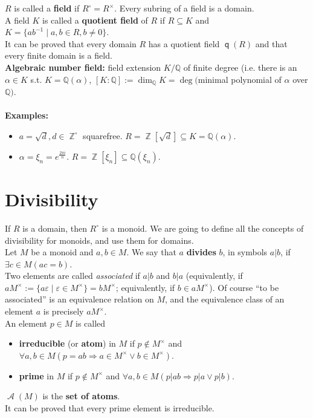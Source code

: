 \documentclass[12pt,a4paper]{report}
\theoremstyle{definition}
\theoremstyle{num.custom-title}
\DeclareMathOperator{\A}{\mathcal{A}}
\DeclareMathOperator{\Z}{\mathbb{Z}}
\DeclareMathOperator{\imp}{\Rightarrow}
\DeclareMathOperator{\sse}{\subseteq}
\DeclareMathOperator{\q}{\mathsf{q}}
\newcommand{\Q}{\mathbb{Q}}
\renewcommand{\epsilon}{\varepsilon}
\begin{document}
$R$ is called a \textbf{field} if $R^\circ=R^\times$. Every subring of a field is a domain.\\
A field $K$ is called a \textbf{quotient field} of $R$ if $R \sse K$ and $K=\{a b^{-1} \mid a,b \in R, b \neq 0\}$.\\
It can be proved that every domain $R$ has a quotient field $\q(R)$ and that every finite domain is a field.\\
\textbf{Algebraic number field:} field extension $K/\Q$ of finite degree (i.e. there is an $\alpha \in K$ s.t. $K=\Q(\alpha)$, $[K:\Q]:=\dim_{\Q} K = \deg($minimal polynomial of $\alpha$ over $\Q)$.\\
\\
\textbf{Examples:}
\begin{itemize}
\item $a=\sqrt{d}, d \in \Z^\circ$ squarefree. $R=\Z[\sqrt{d}] \sse K=\Q(\alpha)$.
\item $\alpha= \xi_n = e^{\frac{2\pi i}{n}}$. $R=\Z[\xi_n] \sse \Q(\xi_n)$.
\end{itemize}


\section{Divisibility}

If $R$ is a domain, then $R^\circ$ is a monoid. We are going to define all the concepts of divisibility for monoids, and use them for domains.\\
Let $M$ be a monoid and $a,b \in M$. We say that $a$ \textbf{divides} $b$, in symbols $a|b$, if $\exists c \in M (ac=b)$.\\
Two elements are called \emph{associated} if $a|b$ and $b|a$ (equivalently, if $aM^\times := \{a\epsilon \mid \epsilon \in M^\times\} = bM^\times$; equivalently, if $b \in aM^\times$). Of course ``to be associated'' is an equivalence relation on $M$, and the equivalence class of an element $a$ is precisely $aM^\times$.\\
An element $p \in M$ is called 
\begin{itemize}
\item \textbf{irreducible} (or \textbf{atom}) in $M$ if $p \not\in M^\times$ and $\forall a,b \in M (p=ab \imp a \in M^\times \vee b \in M^\times)$.
\item \textbf{prime} in $M$ if $p \not\in M^\times$ and $\forall a,b \in M (p|ab \imp p|a \vee p|b)$.
\end{itemize}
$\A(M)$ is the \textbf{set of atoms}.\\
It can be proved that every prime element is irreducible.
\end{document}
